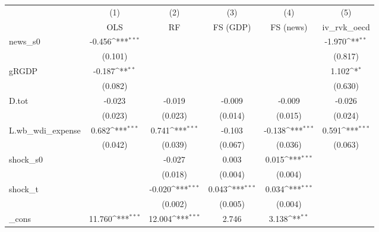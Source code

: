 {
\def\sym#1{\ifmmode^{#1}\else\(^{#1}\)\fi}
\begin{tabular}{l*{5}{c}}
\toprule
            &\multicolumn{1}{c}{(1)}&\multicolumn{1}{c}{(2)}&\multicolumn{1}{c}{(3)}&\multicolumn{1}{c}{(4)}&\multicolumn{1}{c}{(5)}\\
            &\multicolumn{1}{c}{OLS}&\multicolumn{1}{c}{RF}&\multicolumn{1}{c}{FS (GDP)}&\multicolumn{1}{c}{FS (news)}&\multicolumn{1}{c}{iv\_rvk\_oecd}\\
\midrule
news\_s0     &      -0.456\sym{***}&                     &                     &                     &      -1.970\sym{**} \\
            &     (0.101)         &                     &                     &                     &     (0.817)         \\
\addlinespace
gRGDP       &      -0.187\sym{**} &                     &                     &                     &       1.102\sym{*}  \\
            &     (0.082)         &                     &                     &                     &     (0.630)         \\
\addlinespace
D.tot       &      -0.023         &      -0.019         &      -0.009         &      -0.009         &      -0.026         \\
            &     (0.023)         &     (0.023)         &     (0.014)         &     (0.015)         &     (0.024)         \\
\addlinespace
L.wb\_wdi\_expense&       0.682\sym{***}&       0.741\sym{***}&      -0.103         &      -0.138\sym{***}&       0.591\sym{***}\\
            &     (0.042)         &     (0.039)         &     (0.067)         &     (0.036)         &     (0.063)         \\
\addlinespace
shock\_s0    &                     &      -0.027         &       0.003         &       0.015\sym{***}&                     \\
            &                     &     (0.018)         &     (0.004)         &     (0.004)         &                     \\
\addlinespace
shock\_t     &                     &      -0.020\sym{***}&       0.043\sym{***}&       0.034\sym{***}&                     \\
            &                     &     (0.002)         &     (0.005)         &     (0.004)         &                     \\
\addlinespace
\_cons      &      11.760\sym{***}&      12.004\sym{***}&       2.746         &       3.138\sym{**} &                     \\

\end{tabular}}

